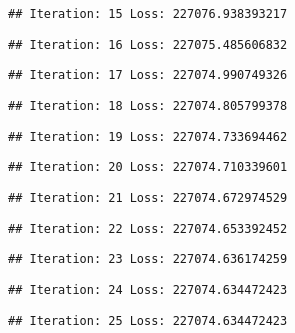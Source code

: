 \documentclass[
]{article}
\begin{document}
\begin{verbatim}
## Iteration: 15 Loss: 227076.938393217
\end{verbatim}

\begin{verbatim}
## Iteration: 16 Loss: 227075.485606832
\end{verbatim}

\begin{verbatim}
## Iteration: 17 Loss: 227074.990749326
\end{verbatim}

\begin{verbatim}
## Iteration: 18 Loss: 227074.805799378
\end{verbatim}

\begin{verbatim}
## Iteration: 19 Loss: 227074.733694462
\end{verbatim}

\begin{verbatim}
## Iteration: 20 Loss: 227074.710339601
\end{verbatim}

\begin{verbatim}
## Iteration: 21 Loss: 227074.672974529
\end{verbatim}

\begin{verbatim}
## Iteration: 22 Loss: 227074.653392452
\end{verbatim}

\begin{verbatim}
## Iteration: 23 Loss: 227074.636174259
\end{verbatim}

\begin{verbatim}
## Iteration: 24 Loss: 227074.634472423
\end{verbatim}

\begin{verbatim}
## Iteration: 25 Loss: 227074.634472423
\end{verbatim}
\end{document}
